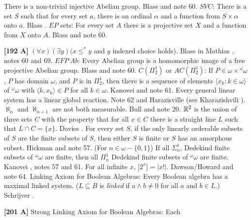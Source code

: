\medskip
{}  There is a non-trivial injective Abelian group.
\ac{Blass}  \cite{1979} and note 60.
\medskip
{} $SVC$: There is a set $S$ such that for every set
$a$, there is an ordinal $\alpha$ and a function from $S\times\alpha$
onto $a$.  \ac{Blass} \cite{1979}.
\medskip
{} $EP$ sets: For every set $A$ there is a projective
set $X$ and a function from $X$ onto $A$.  \ac{Blass} \cite{1979} and
note 60.
\smallskip
\item{}{\bf [192 A]} $(\forall x)(\exists y)(x\le^* y$ and $y$
indexed choice holds).  Blass in \ac{Mathias} \cite{1977b}, notes 60
and 69.
\medskip
{} $EFP\ Ab$: Every Abelian group is a homomorphic
image of a free projective Abelian group.  \ac{Blass} \cite{1979}
and note 60.
\medskip
{} $C(\varPi^1_2)$ or $AC(\varPi^1_2)$: If $P\in
\omega\times{}^{\omega}\omega$, $P$ has domain $\omega$, and $P$ is in
$\varPi^1_2$, then there is a sequence of elements $\langle x_{k}:
k\in\omega\rangle$ of ${}^{\omega}\omega$ with $\langle k,x_{k}\rangle
\in P$ for all $k\in\omega$. \ac{Kanovei} \cite{1979} and note 61.
\medskip
{}  Every general linear system has a linear global
reaction.  Note 62 and Harazisville (see \ac{Kharazishvili} \cite{1979}).
\medskip
{} $\aleph_{\alpha}$ and
$\aleph_{\alpha+1}$ are not both measurable. \ac{Bull} \cite{1978} and
note 20.
\medskip
{} ${\Bbb R}^{2}$ is the union of three sets $C$
with the property that for all $x\in C$ there is a straight line $L$
such that $L\cap C = \{x\}$.  \ac{Davies} \cite{1978}.
\medskip
{} For every set $S$, if the only linearly orderable
subsets of $S$ are the finite subsets of $S$, then either $S$ is finite
or $S$ has an amorphous subset. \ac{Hickman} \cite{1978b} and note 57.
\medskip
{} (For $n\in\omega-\{0,1\}$) If all
$\varSigma^{1}_{n}$, Dedekind finite subsets of ${}^{\omega }\omega$
are finite, then all $\varPi^1_n$ Dedekind finite subsets of ${}^{\omega}
\omega$ are finite.  \ac{Kanovei} \cite{1978}, notes 57 and 61.
\medskip
{} For all infinite $x$, $|2^{x}| = |x!|$.
\ac{Dawson/Howard}  \cite{1976} and note 64.
\medskip
{} Linking Axiom for Boolean Algebras: Every Boolean
algebra has a maximal linked system. ($L\subseteq B$ is {\it linked} if
$a\wedge b\neq 0$ for all $a$ and $b \in L$.)  \ac{Schrijver} \cite{1978}.
\smallskip
\item{}{\bf [201 A]}  Strong Linking Axiom for Boolean Algebras: Each

